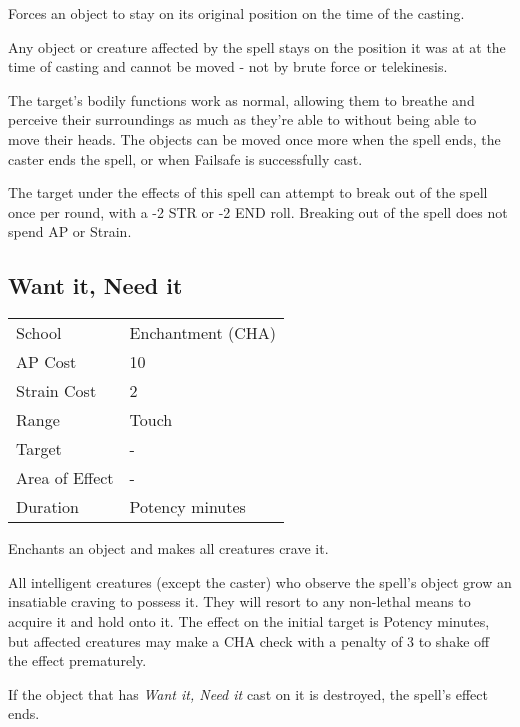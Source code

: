 \documentclass[11pt,a4paper,twocolumn]{book}
\begin{document}
\medskip

Forces an object to stay on its original position on the time of the casting.

Any object or creature affected by the spell stays on the position it was at at the time of casting and cannot be moved - not by brute force or telekinesis. 

The target's bodily functions work as normal, allowing them to breathe and perceive their surroundings as much as they're able to without being able to move their heads. The objects can be moved once more when the spell ends, the caster ends the spell, or when Failsafe is successfully cast.

The target under the effects of this spell can attempt to break out of the spell once per round, with a -2 STR or -2 END roll. Breaking out of the spell does not spend AP or Strain.


\subsection*{Want it, Need it}
{
	\begin{tabu} to 75mm{| X[l,4] | X[l,7] |}
		\hline
		School 			& Enchantment (CHA) 		\\
		AP Cost	      	& 10 						\\
		Strain Cost     & 2 						\\
		Range     		& Touch 					\\
		Target      	& -							\\
		Area of Effect  & - 	 					\\
		Duration     	& Potency minutes			\\ \hline
	\end{tabu}
	
}

\medskip

Enchants an object and makes all creatures crave it.

All intelligent creatures (except the caster) who observe the spell's object grow an insatiable craving to possess it. They will resort to any non-lethal means to acquire it and hold onto it. The effect on the initial target is Potency minutes, but affected creatures may make a CHA check with a penalty of 3 to shake off the effect prematurely.

If the object that has \textit{Want it, Need it} cast on it is destroyed, the spell's effect ends.
\end{document}
